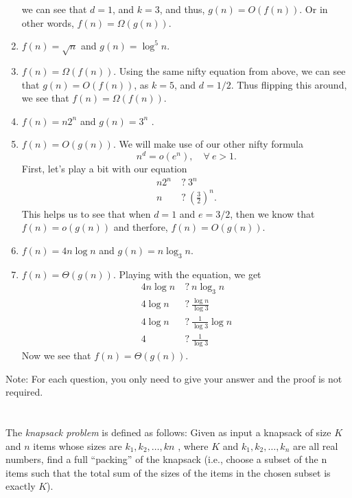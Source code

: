 \documentclass{article}
\begin{document}
\begin{enumerate}[label=(\alph*)]
\begin{equation}
  \end{equation}
we can see that $d = 1$, and $k = 3$, and thus, $g(n) = O(f(n))$. 
Or in other words, $f(n) = \Omega(g(n))$.
\item $f (n) =\sqrt{n}$ and $g(n) = \log^5 n$.
\item[] $f(n) = \Omega(f(n))$. Using the same nifty equation from
  above, we can see that $g(n) = O(f(n))$, as $k = 5$, and $d = 1/2$.
  Thus flipping this around, we see that $f(n) = \Omega(f(n))$.
\item $f (n) = n2^n$ and $g(n) = 3^n$ .
\item[] $f(n) = O(g(n))$.  We will make use of our other nifty
  formula 
  \begin{equation}
    n^d = o(e^n), \quad \forall\: e > 1.
  \end{equation}
First, let's play a bit with our equation
\begin{equation}
\begin{split}
  n2^n &\: ?\: 3^n\\
  n &\: ? \:  \left(\frac{3}{2}\right)^n.
\end{split}
\end{equation}
This helps us to see that when $d = 1$ and $ e = 3/2$, then 
we know that $f(n) = o(g(n))$ and therfore, $f(n) = O(g(n))$.
\item $f (n) = 4n \log n$ and $g(n) = n \log_3 n$.
\item[] $f(n) = \Theta(g(n))$. Playing with the equation, we get
  \begin{equation}
    \begin{split}
    4n \log n &\: ? \: n \log_3 n\\
    4 \log n &\: ? \: \frac{\log n}{\log 3}\\
    4 \log n &\: ? \: \frac{1}{\log 3} \log n\\
    4 &\: ? \: \frac{1}{\log 3}
    \end{split}
  \end{equation}
Now we see that $f(n) = \Theta(g(n))$.
\end{enumerate}


Note: For each question, you only need to give your answer and the
proof is not required. 


\section{}
The \emph{knapsack problem} is defined as follows: Given as input a
knapsack of size $K$ and $n$ items whose sizes are $k_1 , k_2 ,
\dots , kn$ , where $K$ and $k_1 , k_2 , \dots , k_n$ are all real
numbers, find a full ``packing'' of the knapsack (i.e., choose a
subset of the n items such that the total sum of the sizes of the
items in the chosen subset is exactly $K$). 
\end{document}
